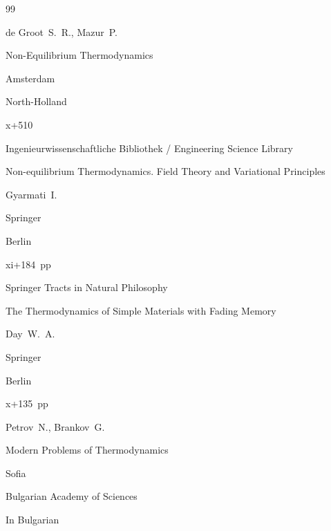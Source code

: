 \begin{thebibliography}{99}




\by de Groot~S.~R., Mazur~P. 

\book Non-Equilibrium Thermodynamics

\publaddr Amsterdam

\publ North-Holland


\totalpages x+510




\serial  Ingenieurwissenschaftliche Bibliothek / Engineering Science Library


\book Non-equilibrium Thermodynamics. Field Theory and Variational Principles

\by Gyarmati~I.


\publ Springer 

\publaddr Berlin

\totalpages xi+184~pp \nofrills






\serial  Springer Tracts in Natural Philosophy


\book The Thermodynamics of Simple Materials with Fading Memory

\by Day~W.~A.

\publ Springer 

\publaddr Berlin


\totalpages x+135~pp \nofrills





\by Petrov~N., Brankov~G.


\book Modern Problems of Thermodynamics

\publaddr Sofia

\publ Bulgarian Academy of Sciences

\lang In Bulgarian




\end{thebibliography}
